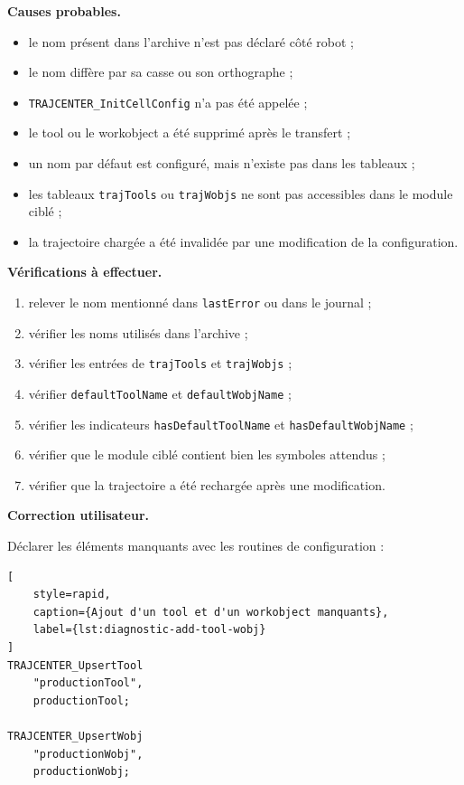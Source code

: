 \documentclass{rapportENSAM}
\begin{document}
\textbf{Causes probables.}

\begin{itemize}
    \item le nom présent dans l'archive n'est pas déclaré côté robot ;
    \item le nom diffère par sa casse ou son orthographe ;
    \item \texttt{TRAJCENTER\_InitCellConfig} n'a pas été appelée ;
    \item le tool ou le workobject a été supprimé après le transfert ;
    \item un nom par défaut est configuré, mais n'existe pas dans les tableaux ;
    \item les tableaux \texttt{trajTools} ou \texttt{trajWobjs} ne sont pas
    accessibles dans le module ciblé ;
    \item la trajectoire chargée a été invalidée par une modification de la
    configuration.
\end{itemize}

\textbf{Vérifications à effectuer.}

\begin{enumerate}
    \item relever le nom mentionné dans \texttt{lastError} ou dans le journal ;
    \item vérifier les noms utilisés dans l'archive ;
    \item vérifier les entrées de \texttt{trajTools} et
    \texttt{trajWobjs} ;
    \item vérifier \texttt{defaultToolName} et
    \texttt{defaultWobjName} ;
    \item vérifier les indicateurs \texttt{hasDefaultToolName} et
    \texttt{hasDefaultWobjName} ;
    \item vérifier que le module ciblé contient bien les symboles attendus ;
    \item vérifier que la trajectoire a été rechargée après une modification.
\end{enumerate}

\textbf{Correction utilisateur.}

Déclarer les éléments manquants avec les routines de configuration :

\begin{lstlisting}[
    style=rapid,
    caption={Ajout d'un tool et d'un workobject manquants},
    label={lst:diagnostic-add-tool-wobj}
]
TRAJCENTER_UpsertTool
    "productionTool",
    productionTool;

TRAJCENTER_UpsertWobj
    "productionWobj",
    productionWobj;
\end{lstlisting}
\end{document}
